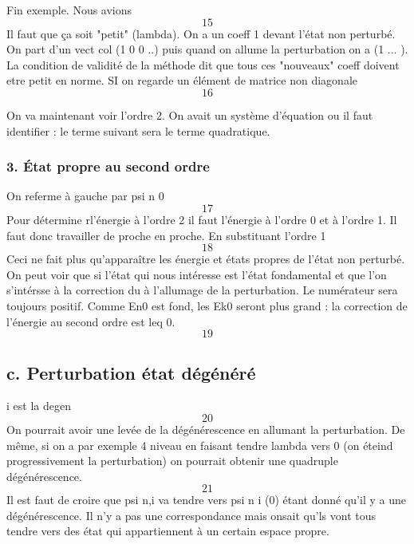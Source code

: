 		
		Fin exemple. Nous avions
		\begin{equation}
		15
		\end{equation}
		Il faut que ça soit "petit" (lambda). On a un coeff 1 devant 
		l'état non perturbé. On part d'un vect col (1 0 0 ..) puis quand 
		on allume la perturbation on a (1 ... ). La condition de validité 
		de la méthode dit que tous ces "nouveaux" coeff doivent etre petit 
		en norme. SI on regarde un élément de matrice non diagonale
		\begin{equation}
		16
		\end{equation}
		
		On va maintenant voir l'ordre 2. On avait un système d'équation 
		ou il faut identifier : le terme suivant sera le terme quadratique.
		
		\subsubsection{3. État propre au second ordre}
		On referme à gauche par psi n 0
		\begin{equation}
		17
		\end{equation}
		Pour détermine rl'énergie à l'ordre 2 il faut l'énergie à l'ordre 0 
		et à l'ordre 1. Il faut donc travailler de proche en proche. En 
		substituant l'ordre 1
		\begin{equation}
		18
		\end{equation}
		Ceci ne fait plus qu'apparaître les énergie et états propres de 
		l'état non perturbé. On peut voir que si l'état qui nous intéresse 
		est l'état fondamental et que l'on s'intérsse à la correction du à 
		l'allumage de la perturbation. Le numérateur sera toujours positif. 
		Comme En0 est fond, les Ek0 seront plus grand : la correction de 
		l'énergie au second ordre est leq 0. 
		\begin{equation}
		19
		\end{equation}
		
	\subsection{c. Perturbation état dégénéré}
	i est la degen
	\begin{equation}
	20
	\end{equation}
	On pourrait avoir une levée de la dégénérescence en allumant la 
	perturbation. De même, si on a par exemple 4 niveau en faisant tendre
	lambda vers 0 (on éteind progressivement la perturbation) on pourrait
	 obtenir une quadruple dégénérescence. 
	\begin{equation}
	21
	\end{equation}
	Il est faut de croire que psi n,i va tendre vers psi n i (0) étant 
	donné qu'il y a une dégénérescence. Il n'y a pas une correspondance mais 
	onsait qu'ls vont tous tendre vers des état qui appartiennent à un 
	certain espace propre. 
	
